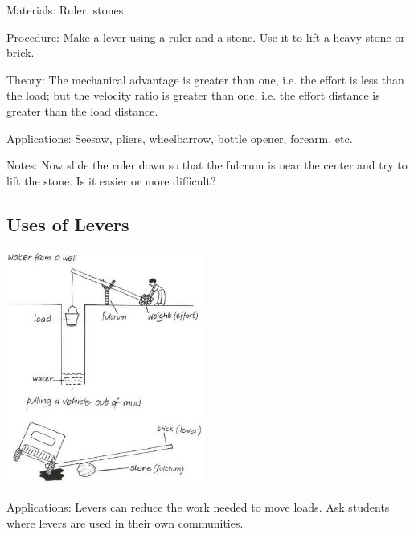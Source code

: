 \begin{multicols}{2}
\begin{description*}
\item[Materials:]{Ruler, stones}
\item[Procedure:]{Make a lever using a ruler and a stone. Use it to lift a heavy stone or brick.}
\item[Theory:]{The mechanical advantage is greater than one, i.e. the effort is less than the load; but the velocity ratio is greater than one, i.e. the effort distance is greater than the load distance.}
\item[Applications:]{Seesaw, pliers, wheelbarrow, bottle opener, forearm, etc.}
\item[Notes:]{Now slide the ruler down so that the fulcrum is near the center and try to lift the stone. Is it easier or more difficult?}
\end{description*}

\vfill
\columnbreak

\subsection{Uses of Levers}

\begin{center}
\includegraphics[width=0.49\textwidth]{./img/vso/using-levers.jpg}
\end{center}

\begin{description*}
\item[Applications:]{Levers can reduce the work needed to move loads.
Ask students where levers are used in their own communities.}
\end{description*}


\end{multicols}
